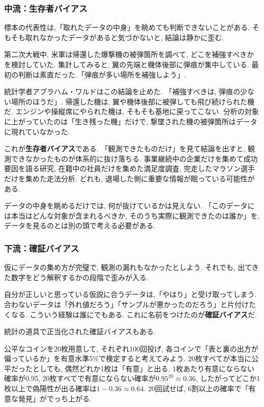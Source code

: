 \subsubsection*{中流：生存者バイアス}

標本の代表性は,「取れたデータの中身」を眺めても判断できないことがある.
そもそも取れなかったデータがあると気づかないと, 結論は静かに歪む.

第二次大戦中, 米軍は帰還した爆撃機の被弾箇所を調べて, どこを補強すべきかを検討していた.
集計してみると, 翼の先端と機体後部に弾痕が集中している.
最初の判断は素直だった.「弾痕が多い場所を補強しよう」.

統計学者アブラハム・ワルドはこの結論を止めた.
「補強すべきは, 弾痕の少ない場所のほうだ」.
帰還した機は, 翼や機体後部に被弾しても飛び続けられた機だ.
エンジンや操縦席にやられた機は, そもそも基地に戻ってこない.
分析の対象に上がっていたのは「生き残った機」だけで, 撃墜された機の被弾箇所はデータに現れていなかった.

これが\textbf{生存者バイアス}である.
「観測できたものだけ」を見て結論を出すと, 観測できなかったものが体系的に抜け落ちる.
事業継続中の企業だけを集めて成功要因を語る研究, 在籍中の社員だけを集めた満足度調査, 完走したマラソン選手だけを集めた走法分析.
どれも, 退場した側に重要な情報が眠っている可能性がある.

データの中身を眺めるだけでは, 何が抜けているかは見えない.
「このデータには本当はどんな対象が含まれるべきか, そのうち実際に観測できたのは誰か」を, データを見るのとは別の頭で考える必要がある.

\subsubsection*{下流：確証バイアス}

仮にデータの集め方が完璧で, 観測の漏れもなかったとしよう.
それでも, 出てきた数字をどう解釈するかの段階で歪みが入る.

自分が正しいと思っている仮説に合うデータは,「やはり」と受け取ってしまう.
合わないデータは「外れ値だろう」「サンプルが悪かったのだろう」と片付けたくなる.
こういう経験は誰にでもある. これに名前をつけたのが\textbf{確証バイアス}だ.

統計の道具で正当化された確証バイアスもある.

公平なコインを20枚用意して, それぞれ100回投げ, 各コインで「表と裏の出方が偏っているか」を有意水準5\%で検定すると考えてみよう.
20枚すべてが本当に公平だったとしても, 偶然どれか1枚は「有意」と出る.
1枚あたり有意にならない確率が0.95, 20枚すべてで有意にならない確率が$0.95^{20} \approx 0.36$, したがってどこか1枚以上で偽陽性が出る確率は$1 - 0.36 \approx 0.64$.
20回試せば, 6割以上の確率で「有意な発見」がでっち上がる.

